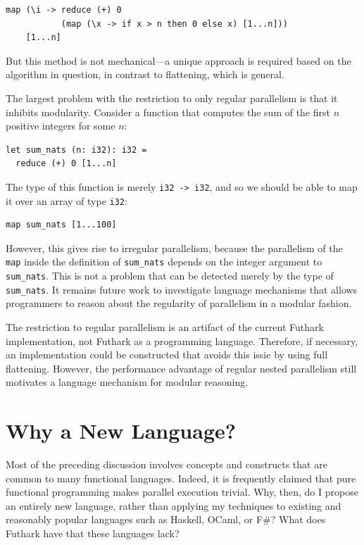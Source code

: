 \begin{lstlisting}
map (\i -> reduce (+) 0
           (map (\x -> if x > n then 0 else x) [1...n]))
    [1...n]
\end{lstlisting}

But this method is not mechanical---a unique approach is required
based on the algorithm in question, in contrast to flattening, which
is general.

The largest problem with the restriction to only regular parallelism
is that it inhibits modularity.  Consider a function that computes the
sum of the first $n$ positive integers for some $n$:

\begin{lstlisting}
let sum_nats (n: i32): i32 =
  reduce (+) 0 [1...n]
\end{lstlisting}

The type of this function is merely \lstinline{i32 -> i32}, and so we
should be able to map it over an array of type \lstinline{i32}:

\begin{lstlisting}
map sum_nats [1...100]
\end{lstlisting}

However, this gives rise to irregular parallelism, because the
parallelism of the \lstinline{map} inside the definition of
\lstinline{sum_nats} depends on the integer argument to
\lstinline{sum_nats}.  This is not a problem that can be detected
merely by the type of \lstinline{sum_nats}.  It remains future work
to investigate language mechanisms that allows programmers to reason
about the regularity of parallelism in a modular fashion.

The restriction to regular parallelism is an artifact of the current
Futhark implementation, not Futhark as a programming language.
Therefore, if necessary, an implementation could be constructed that
avoids this issie by using full flattening.  However, the performance
advantage of regular nested parallelism still motivates a language
mechanism for modular reasoning.

\section{Why a New Language?}
\label{sec:new-language}

Most of the preceding discussion involves concepts and constructs that
are common to many functional languages.  Indeed, it is frequently
claimed that pure functional programming makes parallel execution
trivial.  Why, then, do I propose an entirely new language, rather
than applying my techniques to existing and reasonably popular
languages such as Haskell, OCaml, or F\#?  What does Futhark have that
these languages lack?

